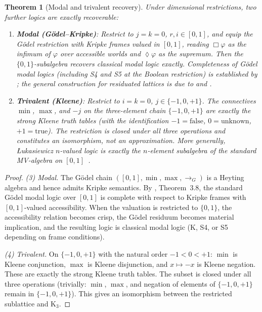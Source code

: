 \documentclass[11pt,a4paper]{article}
\newtheorem{theorem}{Theorem}
\begin{document}
\begin{theorem}[Modal and trivalent recovery]
\label{thm:modal_trivalent}
Under dimensional restrictions, two further logics are exactly
recoverable:
\begin{enumerate}[nosep,start=3]
\item \textbf{Modal (G\"odel--Kripke)}: Restrict to $j=k=0$,
  $r,i\in[0,1]$, and equip the G\"odel restriction with Kripke
  frames valued in $[0,1]$, reading $\Box\varphi$ as the infimum
  of $\varphi$ over accessible worlds and $\lozenge\varphi$ as
  the supremum. Then the $\{0,1\}$-subalgebra recovers classical
  modal logic exactly. Completeness of G\"odel modal logics
  (including S4 and S5 at the Boolean restriction) is established
  by \citet{caicedo2010}; the general construction for residuated
  lattices is due to \citet{bou2011} and \citet{fitting1991}.
\item \textbf{Trivalent (Kleene)}: Restrict to $i=k=0$,
  $j\in\{-1,0,+1\}$. The connectives $\min$, $\max$, and
  $-j$ on the three-element chain $\{-1,0,+1\}$ are exactly
  the strong Kleene truth tables (with the identification
  $-1=\mathrm{false}$, $0=\mathrm{unknown}$,
  $+1=\mathrm{true}$). The restriction is closed under all three
  operations and constitutes an isomorphism, not an
  approximation. More generally, {\L}ukasiewicz $n$-valued logic
  is exactly the $n$-element subalgebra of the standard
  MV-algebra on $[0,1]$~\citep{cignoli2000}.
\end{enumerate}
\end{theorem}

\begin{proof}
\emph{(3) Modal.} The G\"odel chain $([0,1],\min,\max,\to_G)$ is
a Heyting algebra and hence admits Kripke semantics. By
\citet{caicedo2010}, Theorem~3.8, the standard G\"odel modal logic
over $[0,1]$ is complete with respect to Kripke frames with
$[0,1]$-valued accessibility. When the valuation is restricted to
$\{0,1\}$, the accessibility relation becomes crisp, the G\"odel
residuum becomes material implication, and the resulting logic is
classical modal logic (K, S4, or S5 depending on frame conditions).

\emph{(4) Trivalent.} On $\{-1,0,+1\}$ with the natural order
$-1<0<+1$: $\min$ is Kleene conjunction, $\max$ is Kleene
disjunction, and $x\mapsto -x$ is Kleene negation. These are
exactly the strong Kleene truth tables. The subset is closed under
all three operations (trivially: $\min$, $\max$, and negation of
elements of $\{-1,0,+1\}$ remain in $\{-1,0,+1\}$). This gives
an isomorphism between the restricted sublattice and
$\mathrm{K}_3$.
\end{proof}
\end{document}
